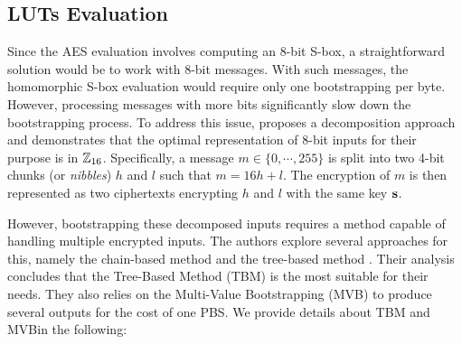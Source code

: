 \subsection{LUTs Evaluation}
\label{sec:primitives_hyppogriph}
Since the \gls{AES} evaluation involves computing an 8-bit S-box, a straightforward solution would be to work with 8-bit messages. With such messages, the homomorphic S-box evaluation would require only one bootstrapping per byte. However, processing messages with more bits significantly slow down the bootstrapping process. To address this issue, \cite{DBLP:conf/wahc/TramaCBS23} proposes a decomposition approach and demonstrates that the optimal representation of 8-bit inputs for their purpose is in $\mathbb{Z}_{16}$. Specifically, a message $m \in \{0, \cdots, 255\}$ is split into two 4-bit chunks (or \emph{nibbles}) $h$ and $l$ such that $m = 16h+l$. The encryption of $m$ is then represented as two ciphertexts encrypting $h$ and $l$ with the same key $\mathbf s$.

However, bootstrapping these decomposed inputs requires a method capable of handling multiple encrypted inputs. The authors explore several approaches for this, namely the chain-based method and the tree-based method \cite{TCHES:GuiBorAra21}. Their analysis concludes that the Tree-Based Method (\gls{TBM}) is the most suitable for their needs. They also relies on the Multi-Value Bootstrapping (MVB) to produce several outputs for the cost of one \gls{PBS}. We provide details about \gls{TBM} and \gls{MVB}in the following:

